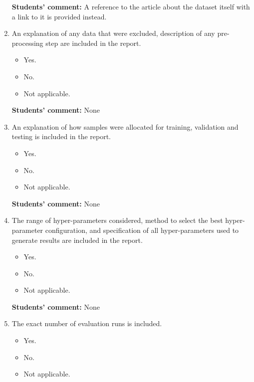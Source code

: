 \documentclass{article}
\begin{document}
\begin{enumerate}
    \textbf{Students' comment:} A reference to the article \cite{DataSet} about the dataset itself with a link to it is provided instead.
    
    \item An explanation of any data that were excluded, description of any pre-processing step are included in the report.
    \begin{itemize}
        \item [\faCheckSquareO] Yes.
        \item [\faSquareO] No.
        \item [\faSquareO] Not applicable.
    \end{itemize}
    
    \textbf{Students' comment:} None
    
    \item An explanation of how samples were allocated for training, validation and testing is included in the report.
    \begin{itemize}
        \item [\faCheckSquareO] Yes.
        \item [\faSquareO] No.
        \item [\faSquareO] Not applicable.
    \end{itemize}
    
    \textbf{Students' comment:} None
    
    \item The range of hyper-parameters considered, method to select the best hyper-parameter
configuration, and specification of all hyper-parameters used to generate results are included in the report.
    \begin{itemize}
        \item [\faSquareO] Yes.
        \item [\faSquareO] No.
        \item [\faSquareO] Not applicable.
    \end{itemize}
    
    \textbf{Students' comment:} None
    
    \item The exact number of evaluation runs is included.
    \begin{itemize}
        \item [\faSquareO] Yes.
        \item [\faSquareO] No.
        \item [\faSquareO] Not applicable.
    \end{itemize}
    

\end{enumerate}
\end{document}

